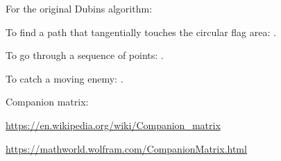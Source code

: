 \documentclass[12pt]{article}
\begin{document}
For the original Dubins algorithm: \cite{Dubins57}

To find a path that tangentially touches the circular flag area: \cite{Jha20}.


To go through a sequence of points: \cite{Manyam2017}.

To catch a moving enemy: \cite{Meyer2015}.

Companion matrix:

\url{https://en.wikipedia.org/wiki/Companion_matrix}

\url{https://mathworld.wolfram.com/CompanionMatrix.html}



% 


\end{document}

